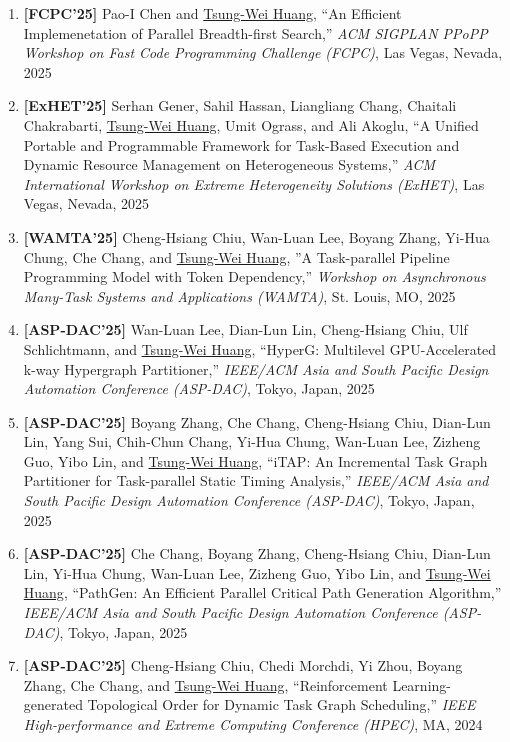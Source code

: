 \documentclass[A4,11pt]{article}
\begin{document}
\begin{enumerate}
    \item \textbf{[FCPC'25]} Pao-I Chen and \underline{Tsung-Wei Huang}, ``An Efficient Implemenetation of Parallel Breadth-first Search,'' \textit{ACM SIGPLAN PPoPP Workshop on Fast Code Programming Challenge (FCPC)}, Las Vegas, Nevada, 2025

    \item \textbf{[ExHET'25]} Serhan Gener, Sahil Hassan, Liangliang Chang, Chaitali Chakrabarti, \underline{Tsung-Wei Huang}, Umit Ograss, and Ali Akoglu, ``A Unified Portable and Programmable Framework for Task-Based Execution and Dynamic Resource Management on Heterogeneous Systems,'' \textit{ACM International Workshop on Extreme Heterogeneity Solutions (ExHET)}, Las Vegas, Nevada, 2025

    \item \textbf{[WAMTA'25]} Cheng-Hsiang Chiu, Wan-Luan Lee, Boyang Zhang, Yi-Hua Chung, Che Chang, and \underline{Tsung-Wei Huang}, ''A Task-parallel Pipeline Programming Model with Token Dependency,'' \textit{Workshop on Asynchronous Many-Task Systems and Applications (WAMTA)}, St. Louis, MO, 2025

    \item \textbf{[ASP-DAC'25]} Wan-Luan Lee, Dian-Lun Lin, Cheng-Hsiang Chiu, Ulf Schlichtmann, and \underline{Tsung-Wei Huang}, ``HyperG: Multilevel GPU-Accelerated k-way Hypergraph Partitioner,'' \textit{IEEE/ACM Asia and South Pacific Design Automation Conference (ASP-DAC)}, Tokyo, Japan, 2025

    \item \textbf{[ASP-DAC'25]} Boyang Zhang, Che Chang, Cheng-Hsiang Chiu, Dian-Lun Lin, Yang Sui, Chih-Chun Chang, Yi-Hua Chung, Wan-Luan Lee, Zizheng Guo, Yibo Lin, and \underline{Tsung-Wei Huang}, ``iTAP: An Incremental Task Graph Partitioner for Task-parallel Static Timing Analysis,'' \textit{IEEE/ACM Asia and South Pacific Design Automation Conference (ASP-DAC)}, Tokyo, Japan, 2025

    \item \textbf{[ASP-DAC'25]} Che Chang, Boyang Zhang, Cheng-Hsiang Chiu, Dian-Lun Lin, Yi-Hua Chung, Wan-Luan Lee, Zizheng Guo, Yibo Lin, and \underline{Tsung-Wei Huang}, ``PathGen: An Efficient Parallel Critical Path Generation Algorithm,'' \textit{IEEE/ACM Asia and South Pacific Design Automation Conference (ASP-DAC)}, Tokyo, Japan, 2025

    \item \textbf{[ASP-DAC'25]} Cheng-Hsiang Chiu, Chedi Morchdi, Yi Zhou, Boyang Zhang, Che Chang, and \underline{Tsung-Wei Huang}, ``Reinforcement Learning-generated Topological Order for Dynamic Task Graph Scheduling,'' \textit{IEEE High-performance and Extreme Computing Conference (HPEC)}, MA, 2024


\end{enumerate}
\end{document}
